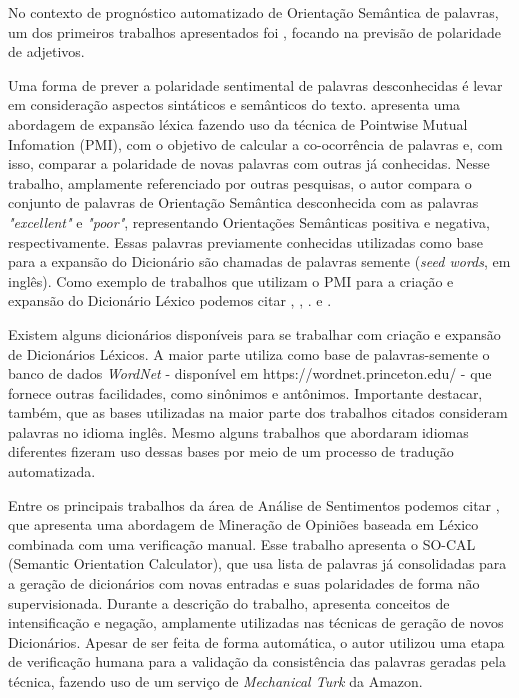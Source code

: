 \documentclass[12pt]{article}
\begin{document}
No contexto de prognóstico automatizado de Orientação Semântica de palavras, um dos primeiros trabalhos apresentados foi \cite{Hatzivassiloglou}, focando na previsão de polaridade de adjetivos.

Uma forma de prever a polaridade sentimental de palavras desconhecidas é levar em consideração aspectos sintáticos e semânticos do texto. \cite{Turney2002} apresenta uma abordagem de expansão léxica fazendo uso da técnica de Pointwise Mutual Infomation (PMI), com o objetivo de calcular a co-ocorrência de palavras e, com isso, comparar a polaridade de novas palavras com outras já conhecidas. Nesse trabalho, amplamente referenciado por outras pesquisas, o autor compara o conjunto de palavras de Orientação Semântica desconhecida com as palavras \emph{ "excellent"} e \emph{"poor"}, representando Orientações Semânticas positiva e negativa, respectivamente. Essas palavras previamente conhecidas utilizadas como base para a expansão do Dicionário são chamadas de palavras semente (\emph{seed words}, em inglês). Como exemplo de trabalhos que utilizam o PMI para a criação e expansão do Dicionário Léxico podemos citar \cite{becker2013}, \cite{Zhou2014}, \cite{Pinto2007}. \cite{Pantel2006} e \cite{kaji}.

Existem alguns dicionários disponíveis para se trabalhar com criação e expansão de Dicionários Léxicos. A maior parte utiliza como base de palavras-semente o banco de dados \emph{WordNet} - disponível em https://wordnet.princeton.edu/ - que fornece outras facilidades, como sinônimos e antônimos. Importante destacar, também, que as bases utilizadas na maior parte dos trabalhos citados consideram palavras no idioma inglês. Mesmo alguns trabalhos que abordaram idiomas diferentes fizeram uso dessas bases por meio de um processo de tradução automatizada.

Entre os principais trabalhos da área de Análise de Sentimentos podemos citar \cite{taboada2011lexicon}, que apresenta uma abordagem de Mineração de Opiniões baseada em Léxico combinada com uma verificação manual. Esse trabalho apresenta o SO-CAL (Semantic Orientation Calculator), que usa lista de palavras já consolidadas para a geração de dicionários com novas entradas e suas polaridades de forma não supervisionada. Durante a descrição do trabalho, apresenta conceitos de intensificação e negação, amplamente utilizadas nas técnicas de geração de novos Dicionários. Apesar de ser feita de forma automática, o autor utilizou uma etapa de verificação humana para a validação da consistência das palavras geradas pela técnica, fazendo uso de um serviço de\emph{ Mechanical Turk} da Amazon. 
\end{document}
